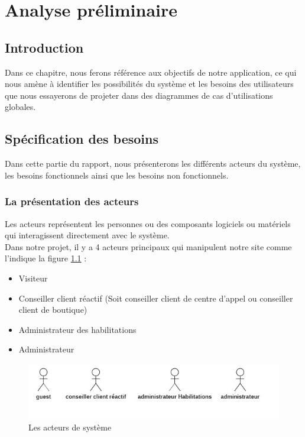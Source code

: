 \chapter{Analyse préliminaire}

\section*{Introduction}
Dans ce chapitre, nous ferons référence aux objectifs de notre application, ce qui nous amène à identifier les possibilités du système et les besoins des utilisateurs que nous essayerons de projeter dans des diagrammes de cas d’utilisations globales.
    
\section[Spécification des besoins]{Spécification des besoins}
Dans cette partie du rapport, nous présenterons les différents acteurs du système, les besoins fonctionnels ainsi que les besoins non fonctionnels.
\subsection[La présentation des acteurs ]{La présentation des acteurs }
Les acteurs représentent les personnes ou des composants logiciels ou matériels qui interagissent directement avec le système.\\
Dans notre projet, il y a 4 acteurs principaux qui manipulent notre site comme l'indique la figure \ref{fig:actors} :
\begin{itemize}
	\item Visiteur
	\item Conseiller client réactif (Soit conseiller client de centre d’appel ou conseiller client de boutique)
	\item Administrateur des habilitations
	\item Administrateur
\end{itemize}

\begin{figure}[tbph]
	\centering
	\includegraphics[width=0.7\linewidth]{img/conception/usecases/actors}
	\caption[Les acteurs de système]{Les acteurs de système}
	\label{fig:actors}
\end{figure}


